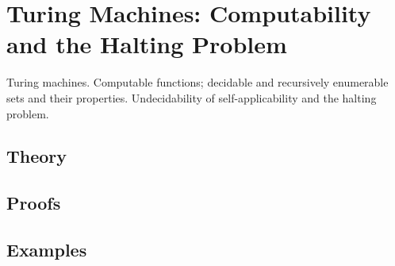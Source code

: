 
\section{Turing Machines: Computability and the Halting Problem}
\label{sec:2.3a.05-turing-machines}

\begin{ticket}
Turing machines. Computable functions; decidable and recursively enumerable sets and their properties. Undecidability of self-applicability and the halting problem.
\end{ticket}

\subsection*{Theory}

\subsection*{Proofs}

\subsection*{Examples}
